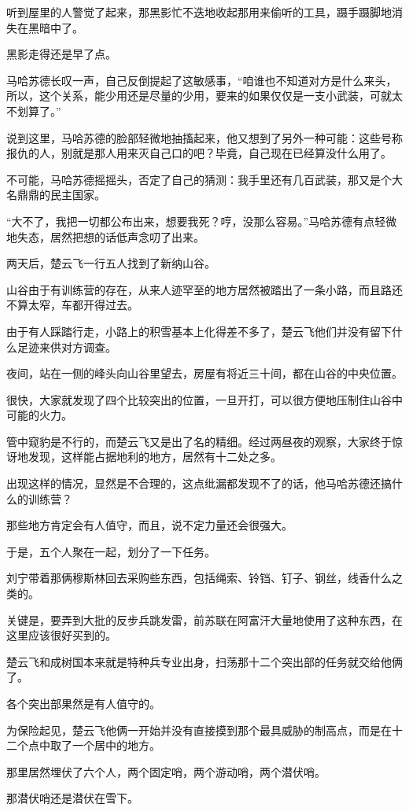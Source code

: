 听到屋里的人警觉了起来，那黑影忙不迭地收起那用来偷听的工具，蹑手蹑脚地消失在黑暗中了。

黑影走得还是早了点。

马哈苏德长叹一声，自己反倒提起了这敏感事，“咱谁也不知道对方是什么来头，所以，这个关系，能少用还是尽量的少用，要来的如果仅仅是一支小武装，可就太不划算了。”

说到这里，马哈苏德的脸部轻微地抽搐起来，他又想到了另外一种可能：这些号称报仇的人，别就是那人用来灭自己口的吧？毕竟，自己现在已经算没什么用了。

不可能，马哈苏德摇摇头，否定了自己的猜测：我手里还有几百武装，那又是个大名鼎鼎的民主国家。

“大不了，我把一切都公布出来，想要我死？哼，没那么容易。”马哈苏德有点轻微地失态，居然把想的话低声念叨了出来。

两天后，楚云飞一行五人找到了新纳山谷。

山谷由于有训练营的存在，从来人迹罕至的地方居然被踏出了一条小路，而且路还不算太窄，车都开得过去。

由于有人踩踏行走，小路上的积雪基本上化得差不多了，楚云飞他们并没有留下什么足迹来供对方调查。

夜间，站在一侧的峰头向山谷里望去，房屋有将近三十间，都在山谷的中央位置。

很快，大家就发现了四个比较突出的位置，一旦开打，可以很方便地压制住山谷中可能的火力。

管中窥豹是不行的，而楚云飞又是出了名的精细。经过两昼夜的观察，大家终于惊讶地发现，这样能占据地利的地方，居然有十二处之多。

出现这样的情况，显然是不合理的，这点纰漏都发现不了的话，他马哈苏德还搞什么的训练营？

那些地方肯定会有人值守，而且，说不定力量还会很强大。

于是，五个人聚在一起，划分了一下任务。

刘宁带着那俩穆斯林回去采购些东西，包括绳索、铃铛、钉子、钢丝，线香什么之类的。

关键是，要弄到大批的反步兵跳发雷，前苏联在阿富汗大量地使用了这种东西，在这里应该很好买到的。

楚云飞和成树国本来就是特种兵专业出身，扫荡那十二个突出部的任务就交给他俩了。

各个突出部果然是有人值守的。

为保险起见，楚云飞他俩一开始并没有直接摸到那个最具威胁的制高点，而是在十二个点中取了一个居中的地方。

那里居然埋伏了六个人，两个固定哨，两个游动哨，两个潜伏哨。

那潜伏哨还是潜伏在雪下。


